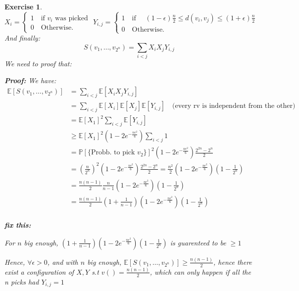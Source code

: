\documentclass{article}
\newtheorem{exo}{Exercise}
\def\P{\mathbb{P}}
\def\E{\mathbb{E}}
\begin{document}
\begin{exo}{\ \\}
\[
X_i = 
\begin{cases}
    1 \quad \text{if $v_i$ was picked } \\
    0 \quad \text{Otherwise.}
\end{cases}
Y_{i,j} = 
\begin{cases}
    1 \quad \text{if } \quad
    (1-\epsilon)\frac{n}{2} \leq d(v_i, v_j) \leq (1+\epsilon)\frac{n}{2} \\
    0 \quad \text{Otherwise.}
\end{cases}
\]
And finally:
\[
S(v_1, \dots, v_{2^n}) = \sum_{i < j} X_i X_j Y_{i,j}
\]
We need to proof that:

\begin{tcolorbox}    
\textbf{Proof:} 
We have:
\begin{align*}
    \E[S(v_1, \dots, v_{2^n})] 
    &= \sum_{i < j} \E[X_i X_j Y_{i,j}] \\
    &= \sum_{i < j} \E[X_i] \E[X_j] \E[Y_{i,j}] 
    \quad \text{(every rv is independent from the other)}\\
    &= \E[X_1]^2 \sum_{i < j} \E[Y_{i,j}] \\
    &\geq \E[X_1]^2 (1 - 2 e^{-\frac{n \epsilon^2 }{6}})  \sum_{i < j} 1 \\ 
    &= \P[\{\text{Probb. to pick $v_2$}\}]^2 (1 - 2 e^{-\frac{n \epsilon^2 }{6}})  
    \frac{2^{2n} - 2^n}{2} \\ 
    &= \left(\frac{n}{2^n}\right)^2 (1 - 2 e^{-\frac{n \epsilon^2 }{6}})  
    \frac{2^{2n} - 2^n}{2}
    = \frac{n^2}{2}  (1 - 2 e^{-\frac{n \epsilon^2 }{6}})(1 - \frac{1}{2^n} ) \\ 
    &= \frac{n(n-1)}{2} \frac{n}{n-1}  (1 - 2 e^{-\frac{n \epsilon^2 }{6}})(1 - \frac{1}{2^n} ) \\ 
    &= \frac{n(n-1)}{2} 
    (1 + \frac{1}{n-1})(1 - 2 e^{-\frac{n \epsilon^2 }{6}})(1 - \frac{1}{2^n} ) \\ 
\end{align*}

\textbf{fix this:} 

For $n$ big enough, 
$(1 + \frac{1}{n-1})(1 - 2 e^{-\frac{n \epsilon^2 }{6}})(1 - \frac{1}{2^n} )$ is guarenteed to be $\geq 1$

Hence, $\forall \epsilon > 0$, and  with $n$ big enough, $\E[S(v_1, \dots, v_{2^n})] \geq \frac{n(n-1)}{2}  $, hence there exist a configuration of $X, Y$ s.t $v() = \frac{n(n-1)}{2} $, which can only happen if all the n picks had $Y_{i,j} =1$
\end{tcolorbox}
\end{exo}
\end{document}
